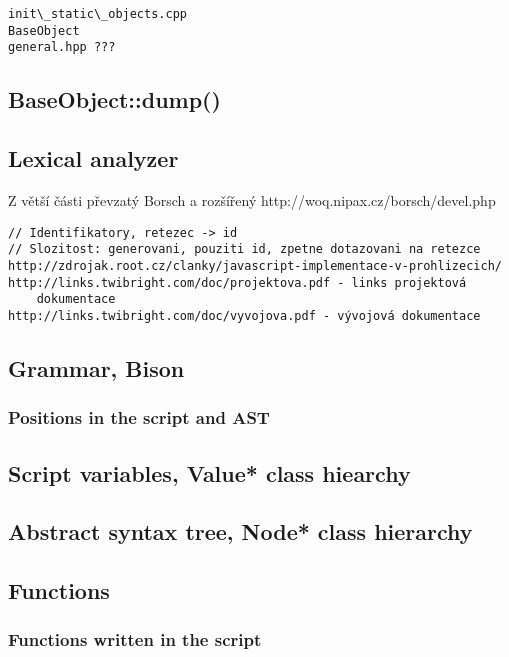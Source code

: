 \documentclass[11pt,twoside,a4paper]{book}
\begin{document}
\begin{verbatim}
init\_static\_objects.cpp
BaseObject
general.hpp ???
\end{verbatim}


\subsection{BaseObject::dump()}

\subsection{Lexical analyzer}

Z větší části převzatý Borsch a rozšířený
http://woq.nipax.cz/borsch/devel.php

\begin{verbatim}
// Identifikatory, retezec -> id
// Slozitost: generovani, pouziti id, zpetne dotazovani na retezce
http://zdrojak.root.cz/clanky/javascript-implementace-v-prohlizecich/
http://links.twibright.com/doc/projektova.pdf - links projektová
	dokumentace
http://links.twibright.com/doc/vyvojova.pdf - vývojová dokumentace
\end{verbatim}


\subsection{Grammar, Bison}

\subsubsection{Positions in the script and AST}


\subsection{Script variables, Value* class hiearchy}

\subsection{Abstract syntax tree, Node* class hierarchy}


\subsection{Functions}

\subsubsection{Functions written in the script}
\end{document}
